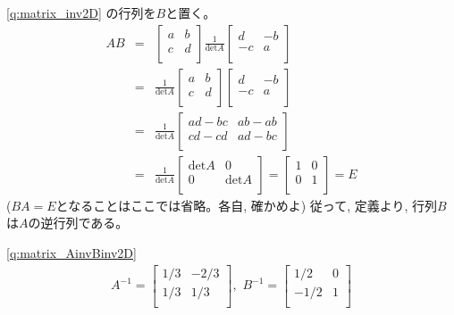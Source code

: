 %
\ref{q:matrix_inv2D}
の行列を$B$と置く。
\begin{eqnarray*}
AB &=& 
\begin{bmatrix}
a & b \\
c & d \\
\end{bmatrix}
 \frac{1}{\text{det}A} 
\begin{bmatrix}
d & -b \\
-c & a \\
\end{bmatrix}
 \\
&=&  \frac{1}{\text{det}A} 
\begin{bmatrix}
a & b \\
c & d \\
\end{bmatrix}
\begin{bmatrix}
d & -b \\
-c & a \\
\end{bmatrix}
 \\
&=& \frac{1}{\text{det}A} 
\begin{bmatrix}
ad-bc & ab-ab \\
cd-cd & ad-bc \\
\end{bmatrix}
 \\
&=& \frac{1}{\text{det}A} 
\begin{bmatrix}
\text{det}A & 0 \\
0 & \text{det}A \\
\end{bmatrix}
 =  
\begin{bmatrix}
1 & 0 \\
0 & 1 \\
\end{bmatrix}
 = E
\end{eqnarray*}
($BA=E$となることはここでは省略。各自, 確かめよ) 
従って, 定義より, 行列$B$は$A$の逆行列である。
\mv

%
\ref{q:matrix_AinvBinv2D} 
\begin{eqnarray*}
A^{-1}=
\begin{bmatrix}
1/3 & -2/3 \\
1/3 & 1/3 \\
\end{bmatrix}
,\,\,
B^{-1}=
\begin{bmatrix}
1/2 & 0 \\
-1/2 & 1 \\
\end{bmatrix}
\end{eqnarray*}
\mv

